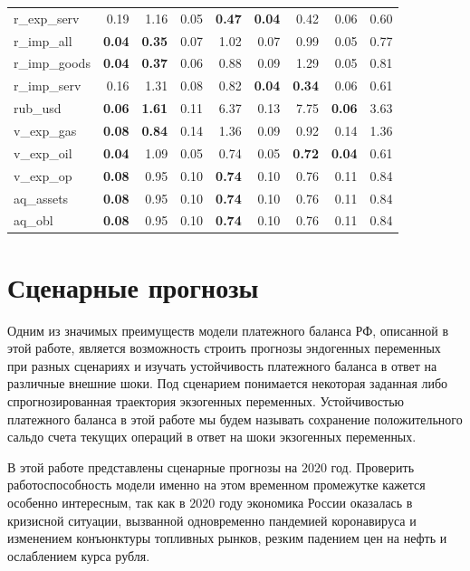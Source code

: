 \documentclass[a4paper, 14pt]{extarticle}
\begin{document}
\begin{center}
\begin{tabular}{l|rr|rr|rr|rr}
		r\_exp\_serv & 0.19 & 1.16 & 0.05 & \textbf{0.47} & \textbf{0.04} & 0.42 & 0.06 & 0.60 \\ 
		r\_imp\_all & \textbf{0.04} & \textbf{0.35} & 0.07 & 1.02 & 0.07 & 0.99 & 0.05 & 0.77 \\ 
		r\_imp\_goods & \textbf{0.04} & \textbf{0.37} & 0.06 & 0.88 & 0.09 & 1.29 & 0.05 & 0.81 \\ 
		r\_imp\_serv & 0.16 & 1.31 & 0.08 & 0.82 & \textbf{0.04} & \textbf{0.34} & 0.06 & 0.61 \\ 
		rub\_usd & \textbf{0.06} & \textbf{1.61} & 0.11 & 6.37 & 0.13 & 7.75 & \textbf{0.06} & 3.63 \\ 
		v\_exp\_gas & \textbf{0.08} & \textbf{0.84} & 0.14 & 1.36 & 0.09 & 0.92 & 0.14 & 1.36 \\ 
		v\_exp\_oil & \textbf{0.04} & 1.09 & 0.05 & 0.74 & 0.05 & \textbf{0.72} & \textbf{0.04} & 0.61 \\ 
		v\_exp\_op & \textbf{0.08} & 0.95 & 0.10 & \textbf{0.74} & 0.10 & 0.76 & 0.11 & 0.84 \\ 
		aq\_assets & \textbf{0.08} & 0.95 & 0.10 & \textbf{0.74} & 0.10 & 0.76 & 0.11 & 0.84 \\ 
		aq\_obl & \textbf{0.08} & 0.95 & 0.10 & \textbf{0.74} & 0.10 & 0.76 & 0.11 & 0.84 \\ 
		\bottomrule
	\end{tabular}
\captionsetup{justification=centering,margin=2cm}
\label{tab:4}
\end{center}
\newpage
\section{Сценарные прогнозы}
Одним из значимых преимуществ модели платежного баланса РФ, описанной в этой работе, является возможность строить прогнозы эндогенных переменных при разных сценариях и изучать устойчивость платежного баланса в ответ на различные внешние шоки.
Под сценарием понимается некоторая заданная либо спрогнозированная траектория экзогенных переменных. 
Устойчивостью платежного баланса в этой работе мы будем называть сохранение положительного сальдо счета текущих операций в ответ на шоки экзогенных переменных.

В этой работе представлены сценарные прогнозы на $2020$ год.
Проверить работоспособность модели именно на этом временном промежутке кажется особенно интересным, так как в $2020$ году экономика России оказалась в кризисной ситуации, вызванной одновременно пандемией коронавируса и изменением конъюнктуры топливных рынков, резким падением цен на нефть и ослаблением курса рубля.
\end{document}
